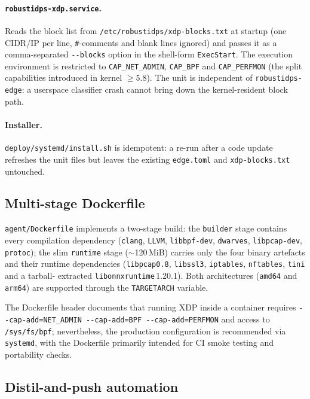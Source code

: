 \paragraph{\texttt{robustidps-xdp.service}.}
Reads the block list from \texttt{/etc/\allowbreak robustidps/\allowbreak xdp-blocks.txt} at
startup (one CIDR/IP per line, \texttt{\#}-comments and blank lines
ignored) and passes it as a comma-separated \texttt{-{}-blocks}
option in the shell-form \texttt{ExecStart}. The execution
environment is restricted to \texttt{CAP\_NET\_ADMIN},
\texttt{CAP\_BPF} and \texttt{CAP\_PERFMON} (the split capabilities
introduced in kernel $\geq 5.8$). The unit is independent of
\texttt{robustidps-edge}: a userspace classifier crash cannot bring
down the kernel-resident block path.

\paragraph{Installer.}
\texttt{deploy/\allowbreak systemd/\allowbreak install.sh} is idempotent: a re-run after a
code update refreshes the unit files but leaves the existing
\texttt{edge.toml} and \texttt{xdp-blocks.txt} untouched.

\subsection{Multi-stage Dockerfile}

\texttt{agent/Dockerfile} implements a two-stage build: the
\texttt{builder} stage contains every compilation dependency
(\texttt{clang}, \texttt{LLVM}, \texttt{libbpf-dev}, \texttt{dwarves},
\texttt{libpcap-dev}, \texttt{protoc}); the slim \texttt{runtime}
stage ($\sim$120\,MiB) carries only the four binary artefacts and
their runtime dependencies (\texttt{libpcap0.8}, \texttt{libssl3},
\texttt{iptables}, \texttt{nftables}, \texttt{tini} and a tarball-
extracted \texttt{libonnxruntime}\,1.20.1). Both architectures
(\texttt{amd64} and \texttt{arm64}) are supported through the
\texttt{TARGETARCH} variable.

The Dockerfile header documents that running XDP inside a container
requires \texttt{-{}-cap-add=NET\_ADMIN -{}-cap-add=BPF
-{}-cap-add=PERFMON} and access to \texttt{/sys/fs/bpf}; nevertheless,
the production configuration is recommended via \texttt{systemd},
with the Dockerfile primarily intended for CI smoke testing and
portability checks.

\subsection{Distil-and-push automation}

